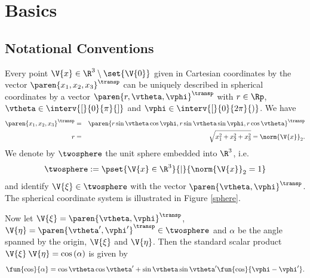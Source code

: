 \chapter{Basics}
\label{Basics}

\section{Notational Conventions}
\label{Basics:Notation}

Every point $\V{x} \in \R^3 \setminus \set{\V{0}}$ given in Cartesian coordinates by the vector 
$\paren{x_1,x_2,x_3}^{\transp}$ can be uniquely described in spherical coordinates by a vector
$\paren{r,\vtheta,\vphi}^{\transp}$ with $r \in \Rp$, $\vtheta \in \interv{[}{0}{\pi}{]}$ and 
$\vphi \in \interv{[}{0}{2\pi}{)}$.
We have
\begin{eqnarray*}
  \paren{x_1,x_2,x_3}^{\transp} & = & \paren{r \sin \vtheta \cos \vphi, r \sin \vtheta \sin \vphi, r \cos \vtheta}^{\transp}\\
  r & = & \sqrt{x_1^2+x_2^2+x_3^2} = \norm{\V{x}}_2.
\end{eqnarray*} 
We denote by $\twosphere$ the unit sphere embedded into $\R^3$, i.e. 
$$\twosphere := \pset{\V{x} \in \R^{3}}{|}{\norm{\V{x}}_2=1}$$ 
and identify $\V{\xi} \in \twosphere$ with the vector $\paren{\vtheta,\vphi}^{\transp}$. The 
spherical coordinate system is illustrated in Figure \ref{sphere}.

Now let $\V{\xi} = \paren{\vtheta,\vphi}^{\transp}$, $\V{\eta} = \paren{\vtheta',\vphi'}^{\transp} \in
\twosphere$ and $\alpha$ be the angle spanned by the origin, $\V{\xi}$ and $\V{\eta}$.
Then the standard scalar product
$\V{\xi} \: \V{\eta} = \cos\left(\alpha\right)$ is given by
\begin{equation}
  \nonumber
  \fun{\cos}{\alpha} = \cos\vtheta\cos\vtheta' +
  \sin\vtheta\sin\vtheta'\fun{\cos}{\vphi-\vphi'}.
\end{equation}

